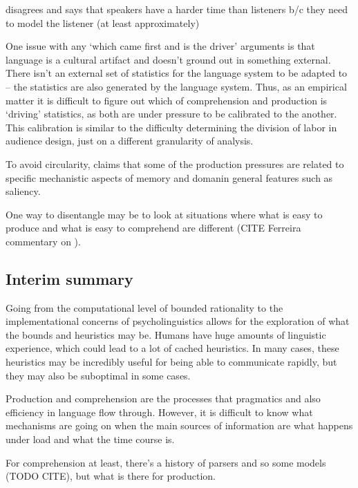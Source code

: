 \documentclass[]{article}
\begin{document}
\cite{heller2012} disagrees and says that speakers have a harder time than listeners b/c they need to model the listener (at least approximately) %

One issue with any `which came first and is the driver' arguments is that language is a cultural artifact and doesn't ground out in something external. There isn't an external set of statistics for the language system to be adapted to -- the statistics are also generated by the language system. Thus, as an empirical matter it is difficult to figure out which of comprehension and production is `driving' statistics, as both are under pressure to be calibrated to the another. This calibration is similar to the difficulty determining the division of labor in audience design, just on a different granularity of analysis. 

To avoid circularity, \cite{macdonald2013} claims that some of the production pressures are related to specific mechanistic aspects of memory and domanin general features such as saliency. %

One way to disentangle may be to look at situations where what is easy to produce and what is easy to comprehend are different (CITE Ferreira commentary on \cite{pickering2004}). 

\subsection{Interim summary}

Going from the computational level of bounded rationality to the implementational concerns of psycholinguistics allows for the exploration of what the bounds and heuristics may be. Humans have huge amounts of linguistic experience, which could lead to a lot of cached heuristics. In many cases, these heuristics may be incredibly useful for being able to communicate rapidly, but they may also be suboptimal in some cases. 

Production and comprehension are the processes that pragmatics and also efficiency in language flow through. However, it is difficult to know what mechanisms are going on when the main sources of information are what happens under load and what the time course is. 

For comprehension at least, there's a history of parsers and so some models (TODO CITE), but what is there for production. 

\end{document}
